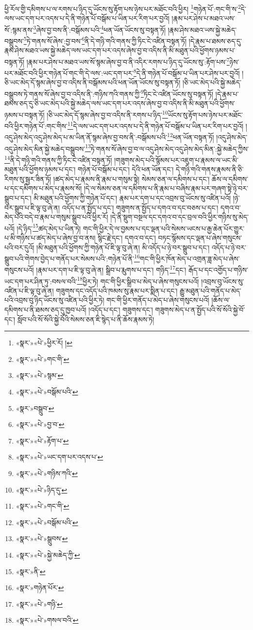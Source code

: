 ཕྱི་རོལ་གྱི་དམིགས་པ་ལ་རགས་པ་ཉིད་དུ་ཡོངས་སུ་རྟོག་པས་ཉེས་པར་མཐོང་བའི་ཕྱིར། \footnote{«སྣར་»«པེ་»ཕྱིར་རོ། ། }གཉེན་པོ་:གང་གི་ས་\footnote{«སྣར་»«པེ་»གང་གི་}དེ་ལས་ཡང་དག་པར་འདས་པ་དེ་ནི་གཉེན་པོ་བསྒོམ་པ་ཡིན་པར་རིག་པར་བྱའོ། །རྣམ་པར་ཤེས་པ་མཐའ་ཡས་སོ་:སྙམ་ནས་\footnote{«སྣར་»«པེ་»སྙམ་}ཞེས་བྱ་བས་ནི་:བསྒོམས་པའི་\footnote{«སྣར་»«པེ་»བསྒོམ་པའི་}ཕན་ཡོན་ཡོངས་སུ་བསྟན་ཏོ། །རྣམ་ཤེས་མཐའ་ཡས་སྐྱེ་མཆེད་བསྒྲུབས་\footnote{«སྣར་»བསྒྲུབ་}ཏེ་གནས་སོ་ཞེས་:བྱ་བས་\footnote{«སྣར་»«པེ་»བྱ་བ་}ནི་དེ་གཉི་གའི་གནས་ཀྱི་ཏིང་ངེ་འཛིན་བསྟན་ཏོ། །དེ་རྣམ་པ་ཐམས་ཅད་དུ་རྣམ་ཤེས་མཐའ་ཡས་སྐྱེ་མཆེད་ལས་ཡང་དག་པར་འདས་ཞེས་བྱ་བ་འདིས་ནི་མི་མཐུན་པའི་ཕྱོགས་ཉམས་པ་བསྟན་ཏོ། །རྣམ་པར་ཤེས་པ་མཐའ་ཡས་སོ་སྙམ་ཞེས་བྱ་བ་ནི་འདིར་རགས་པ་ཉིད་དུ་ཡོངས་སུ་:རྟོག་པས་\footnote{«སྣར་»«པེ་»རྟོག་པ་}ཉེས་པར་མཐོང་བའི་ཕྱིར་གཉེན་པོ་གང་གི་དེ་ལས་:ཡང་དག་པར་\footnote{«སྣར་»«པེ་»ཡང་དག་པར་འདས་པ་}དེ་ནི་གཉེན་པོ་བསྒོམ་པ་ཡིན་པར་ཤེས་པར་བྱའོ། །ཅི་ཡང་མེད་དོ་སྙམ་ཞེས་བྱ་བ་འདིས་ནི་བསྒོམས་པའི་ཕན་ཡོན་ཡོངས་སུ་བསྟན་ཏོ། །ཅི་ཡང་མེད་པའི་སྐྱེ་མཆེད་བསྒྲུབས་ཏེ་གནས་སོ་ཞེས་བྱ་བ་འདིས་ནི་:གཉིས་ཀའི་གནས་ཀྱི་\footnote{«སྣར་»«པེ་»གཉིས་ཀའི་}ཏིང་ངེ་འཛིན་ཡོངས་སུ་བསྟན་ཏོ། །དེ་རྣམ་པ་ཐམས་ཅད་དུ་ཅི་ཡང་མེད་པའི་སྐྱེ་མཆེད་ལས་ཡང་དག་པར་འདས་ཞེས་བྱ་བ་འདིས་ནི་མི་མཐུན་པའི་ཕྱོགས་ཉམས་པ་བསྟན་ཏོ། །ཅི་ཡང་མེད་དོ་སྙམ་ཞེས་བྱ་བ་འདིས་ནི་རགས་པ་ཉིད་\footnote{«སྣར་»«པེ་»ཉིད་དུ་}ཡོངས་སུ་རྟོག་པས་ཉེས་པར་མཐོང་བའི་ཕྱིར་གཉེན་པོ་:གང་གིས་\footnote{«སྣར་»«པེ་»གང་གི་}དེ་ལས་ཡང་དག་པར་འདས་པ་དེ་ནི་གཉེན་པོ་བསྒོམ་པ་ཡིན་པར་རིག་པར་བྱའོ། །འདུ་ཤེས་མེད་འདུ་ཤེས་མེད་པ་མ་ཡིན་ནོ་སྙམ་ཞེས་བྱ་བས་ནི་:བསྒོམས་པའི་\footnote{«སྣར་»«པེ་»བསྒོམ་པའི་}ཕན་ཡོན་བསྟན་ཏོ། །འདུ་ཤེས་མེད་འདུ་ཤེས་མེད་མིན་སྐྱེ་མཆེད་བསྒྲུབས་\footnote{«སྣར་»«པེ་»སྒྲུབས་}ཏེ་གནས་སོ་ཞེས་བྱ་བ་ལ་འདུ་ཤེས་མེད་འདུ་ཤེས་མེད་མིན་:སྐྱེ་མཆེད་ཀྱིས་\footnote{«སྣར་»«པེ་»སྐྱེ་མཆེད་ཀྱི་}ནི་དེ་གཉི་གའི་གནས་ཀྱི་ཏིང་ངེ་འཛིན་བསྟན་ཏོ། །གཟུགས་མེད་པའི་སྙོམས་པར་འཇུག་པ་རྣམས་ལ་ཡང་མི་མཐུན་པའི་ཕྱོགས་ཉམས་པ་དང་། གཉེན་པོ་བསྒོམ་པ་དང་། དེའི་ཕན་ཡོན་དང་། དེ་གཉི་གའི་གནས་རྣམས་ནི་ཅི་རིགས་སུ་སྦྱར་ཟིན་ཏོ། །ཚད་མེད་པ་རྣམས་ནི་རྣམ་པ་གསུམ་སྟེ། སེམས་ཅན་ལ་དམིགས་པ་དང་། ཆོས་ལ་དམིགས་པ་དང་དམིགས་པ་མེད་པ་རྣམས་སོ། །དེ་ལ་སེམས་ཅན་ལ་དམིགས་པ་ནི་རྣམ་པ་བཞིས་རྣམ་པར་གཞག་སྟེ་ཉེ་བར་སྒྲུབ་པ་དང་། མི་མཐུན་པའི་ཕྱོགས་ཀྱི་གཉེན་པོ་དང་། རྣམ་པར་དག་པ་དང་འབྲས་བུ་ཡོངས་སུ་འཛིན་པའོ། །ཉེ་བར་སྒྲུབ་པ་ཇི་ལྟ་བུ་ཞེ་ན། འདོད་པ་ན་སྤྱོད་པ་དང་། གཟུགས་ན་སྤྱོད་པ་དགའ་བ་དང་བཅས་པ་དང་། དགའ་བ་མེད་པའི་བདེ་བ་རྣམ་པ་གསུམ་སྒྲུབ་པའི་ཕྱིར་རོ། །དེ་ནི་སྡུག་བསྔལ་དང་དགའ་བ་དང་བྲལ་བའི་ཕྱིར་གཉིས་སུ་མེད་པའོ། །དེ་ཉིད་\footnote{«སྣར་»ནི་}ཚད་མེད་པ་ཡིན་ཏེ། གང་གི་ཕྱིར་དེ་ལ་བྱམས་པ་དང་ལྡན་པའི་སེམས་ཡངས་པ་རྒྱ་ཆེན་པོར་གྱུར་པ་མི་གཉིས་པ་ཚད་མེད་པ་ཞེས་བྱ་བ་ནས། སྙིང་རྗེ་དང་། དགའ་བ་དང་། བཏང་སྙོམས་དང་ལྡན་པ་ཞེས་གསུངས་པའི་བར་དུའོ། །མི་མཐུན་པའི་ཕྱོགས་ཀྱི་གཉེན་པོ་ཇི་ལྟ་བུ་ཞེ་ན། མི་འདོད་པ་ཉེ་བར་སྒྲུབ་པ་དང་། འདོད་པ་ཉེ་བར་སྒྲུབ་པའི་གེགས་བྱེད་པ་གནོད་པར་སེམས་པའི་:གཉེན་པོ་ནི་\footnote{«སྣར་»གཉེན་པོར་}གང་གི་ཕྱིར་ཁོན་མེད་པ་འགྲན་ཟླ་མེད་པ་ཞེས་གསུངས་པའོ། །རྣམ་པར་དག་པ་ཇི་ལྟ་བུ་ཞེ་ན། སྒྲིབ་པ་རྨུགས་པ་དང་། གཉིད་\footnote{«སྣར་»«པེ་»གཉི་}དང་། རྒོད་པ་དང་འགྱོད་པ་གཉིས་ཡང་དག་པར་ཤིན་ཏུ་:བསལ་བའི་\footnote{«སྣར་»«པེ་»གསལ་བའི་}ཕྱིར་ཏེ། གང་གི་ཕྱིར་སྒྲིབ་པ་མེད་པ་ཞེས་གསུངས་པའོ། །འབྲས་བུ་ཡོངས་སུ་འཛིན་པ་ཇི་ལྟ་བུ་ཞེ་ན། གཟུགས་དང་འདོད་པའི་ཁམས་སུ་རྣམ་པར་སྨིན་པ་དང་། རྒྱུ་མཐུན་པའི་གནོད་པ་མེད་པའི་འབྲས་བུ་ཉིད་ཡོངས་སུ་འཛིན་པའི་ཕྱིར་ཏེ། གང་གི་ཕྱིར་གནོད་པ་མེད་པ་ཞེས་གསུངས་པའོ། །ཆོས་ལ་དམིགས་པ་ནི་ཐམས་ཅད་དུ་ཁྱབ་པའོ། །འདོད་པ་དང་། གཟུགས་དང་། གཟུགས་མེད་པ་ན་སྤྱོད་པའི་སོ་སོའི་སྐྱེ་བོ་དང་། སློབ་པའི་སོ་སོའི་སྐྱེ་བོའི་སེམས་ཅན་ཇི་སྙེད་པ་ནི་ཆོས་རྣམས་ཏེ། 